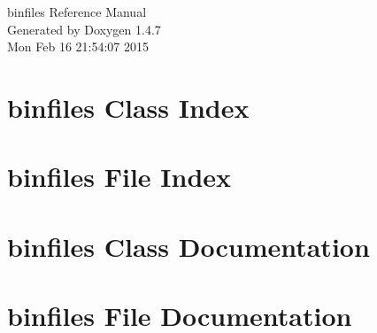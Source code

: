 \documentclass[a4paper]{book}
\begin{document}
\begin{titlepage}
\vspace*{7cm}
\begin{center}
{\Large binfiles Reference Manual}\\
\vspace*{1cm}
{\large Generated by Doxygen 1.4.7}\\
\vspace*{0.5cm}
{\small Mon Feb 16 21:54:07 2015}\\
\end{center}
\end{titlepage}
\clearemptydoublepage
{}
\tableofcontents
\clearemptydoublepage
{}
\chapter{binfiles Class Index}

\chapter{binfiles File Index}

\chapter{binfiles Class Documentation}


\chapter{binfiles File Documentation}







\printindex
\end{document}
